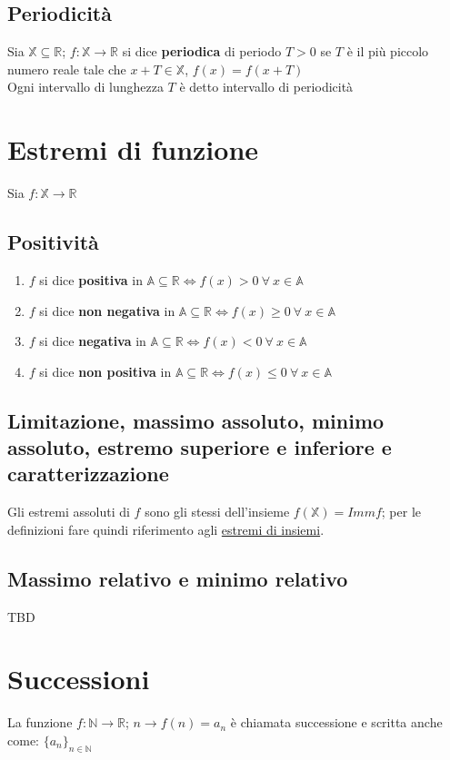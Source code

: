 \subsection{Periodicità}
Sia $\mathbb{X} \subseteq \mathbb{R}$;   $f: \mathbb{X} \rightarrow \mathbb{R}$ si dice \textbf{periodica} di periodo $T>0$ se $T$ è il più piccolo numero reale tale che $x + T \in \mathbb{X}$, $f(x) = f(x + T)$\\
Ogni intervallo di lunghezza $T$ è detto intervallo di periodicità

\section{Estremi di funzione}
Sia $f: \mathbb{X} \rightarrow \mathbb{R}$
\subsection{Positività}
\begin{enumerate}
\item $f$ si dice \textbf{positiva} in $\mathbb{A} \subseteq \mathbb{R} \iff f(x)>0\ \forall\ x \in \mathbb{A}$
\item $f$ si dice \textbf{non negativa} in $\mathbb{A} \subseteq \mathbb{R} \iff f(x) \geq 0\ \forall\ x \in \mathbb{A}$
\item $f$ si dice \textbf{negativa} in $\mathbb{A} \subseteq \mathbb{R} \iff f(x)<0\ \forall\ x \in \mathbb{A}$
\item $f$ si dice \textbf{non positiva} in $\mathbb{A} \subseteq \mathbb{R} \iff f(x) \leq 0\ \forall\ x \in \mathbb{A}$
\end{enumerate}
\subsection{Limitazione, massimo assoluto, minimo assoluto, estremo superiore e inferiore e caratterizzazione}
Gli estremi assoluti di $f$ sono gli stessi dell'insieme $f(\mathbb{X}) = Immf$; per le definizioni fare quindi riferimento agli \hyperref[sec: estremiInsiemi]{\color{cyan}estremi di insiemi}.
\subsection{Massimo relativo e minimo relativo}
TBD
\section{Successioni}
La funzione $f: \mathbb{N} \rightarrow \mathbb{R}$;  $n \rightarrow f(n) = a_n$ è chiamata successione e scritta anche come: $\{a_n\}_{n \in \mathbb{N}}$

